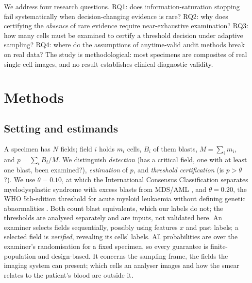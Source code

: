 \documentclass[preprint,12pt]{elsarticle}
\theoremstyle{remark}
\theoremstyle{definition}
\begin{document}
We address four research questions. RQ1: does information-saturation stopping fail systematically when decision-changing evidence is rare? RQ2: why does certifying the \emph{absence} of rare evidence require near-exhaustive examination? RQ3: how many cells must be examined to certify a threshold decision under adaptive sampling? RQ4: where do the assumptions of anytime-valid audit methods break on real data? The study is methodological: most specimens are composites of real single-cell images, and no result establishes clinical diagnostic validity.

\section{Methods}
\subsection{Setting and estimands}
A specimen has $N$ fields; field $i$ holds $m_i$ cells, $B_i$ of them blasts, $M=\sum_im_i$, and $p=\sum_iB_i/M$. We distinguish \emph{detection} (has a critical field, one with at least one blast, been examined?), \emph{estimation} of $p$, and \emph{threshold certification} (is $p>\theta$?). We use $\theta=0.10$, at which the International Consensus Classification separates myelodysplastic syndrome with excess blasts from MDS/AML \cite{arber2022icc}, and $\theta=0.20$, the WHO 5th-edition threshold for acute myeloid leukaemia without defining genetic abnormalities \cite{khoury2022who}. Both count blast equivalents, which our labels do not; the thresholds are analysed separately and are inputs, not validated here. An examiner selects fields sequentially, possibly using features $x$ and past labels; a selected field is \emph{verified}, revealing its cells' labels. All probabilities are over the examiner's randomisation for a fixed specimen, so every guarantee is finite-population and design-based. It concerns the sampling frame, the fields the imaging system can present; which cells an analyser images and how the smear relates to the patient's blood are outside it.
\end{document}
